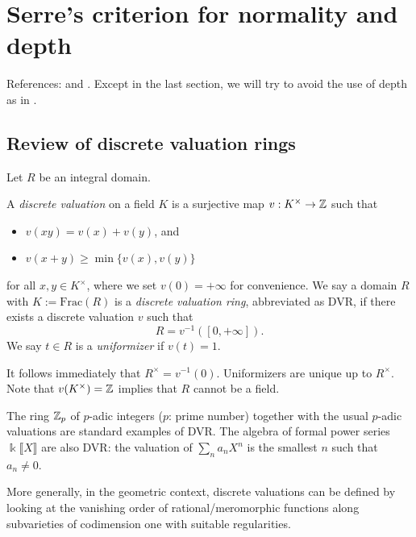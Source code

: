 
\chapter{Serre's criterion for normality and depth}

References: \cite[\S 11]{Eis95} and \cite[{X.1}]{Bour98}. Except in the last section, we will try to avoid the use of depth as in \cite{Eis95}.

\section{Review of discrete valuation rings}
Let $R$ be an integral domain.

\begin{definition}
	A \emph{discrete valuation} on a field $K$ is a surjective map $v: K^\times \to \mathbb{Z}$ such that
	\begin{itemize}
		\item $v(xy) = v(x) + v(y)$, and
		\item $v(x+y) \geq \min\{v(x), v(y) \}$
	\end{itemize}
	for all $x,y \in K^\times$, where we set $v(0) = +\infty$ for convenience. We say a domain $R$ with $K := \mathrm{Frac}(R)$ is a \emph{discrete valuation ring}, abbreviated as DVR, if there exists a discrete valuation $v$ such that
	\[ R = v^{-1}([0, +\infty]). \]
	We say $t \in R$ is a \emph{uniformizer} if $v(t)=1$.
\end{definition}
It follows immediately that $R^\times = v^{-1}(0)$. Uniformizers are unique up to $R^\times$. Note that $v(K^\times) = \mathbb{Z}$ implies that $R$ cannot be a field.

\begin{example}
	The ring $\mathbb{Z}_p$ of $p$-adic integers ($p$: prime number) together with the usual $p$-adic valuations are standard examples of DVR. The algebra of formal power series $\Bbbk\llbracket X\rrbracket$ are also DVR: the valuation of $\sum_n a_n X^n$ is the smallest $n$ such that $a_n \neq 0$.
	
	More generally, in the geometric context, discrete valuations can be defined by looking at the vanishing order of rational/meromorphic functions along subvarieties of codimension one with suitable regularities.
\end{example}

